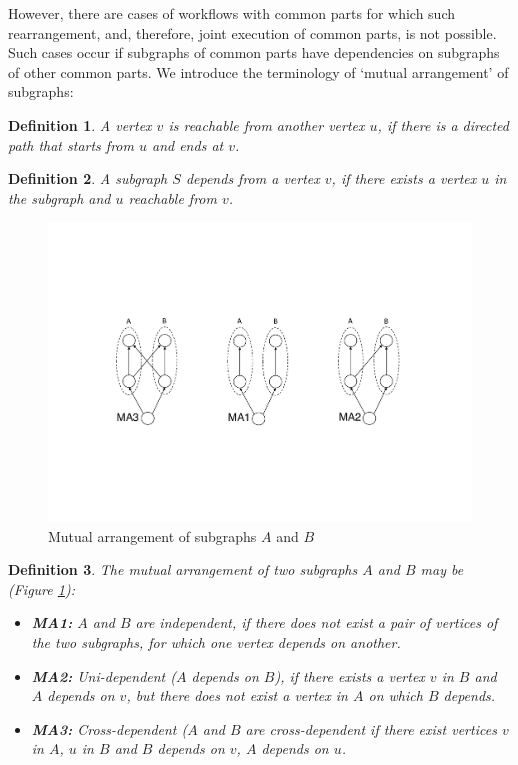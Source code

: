 \documentclass[12pt,openany,onecolumn]{book}
\newtheorem{definition}{Definition}
\begin{document}
However, there are cases of workflows with common parts for which such rearrangement, and, therefore, joint execution of common parts, is not possible. Such cases occur if subgraphs of common parts have dependencies on subgraphs of other common parts. We introduce the terminology of `mutual arrangement' of subgraphs:
\begin{definition}
A vertex $v$ is reachable from another vertex $u$, if there is a directed path that starts from $u$ and ends at $v$.
\end{definition}

\begin{definition}
A subgraph $S$ depends from a vertex $v$, if there exists a vertex $u$ in the subgraph and $u$ reachable from $v$.
\end{definition}

\begin{figure}[h]
\centering
\includegraphics[width=\linewidth]{figs/mutualpositions}
\caption{Mutual arrangement of subgraphs $A$ and $B$}\label{fig:mutpos}
\end{figure}

\begin{definition}
\label{def:mutpos}
The mutual arrangement of two subgraphs $A$ and $B$ may be (Figure \ref{fig:mutpos}):
\begin{itemize}
\item \textbf{MA1:} $A$ and $B$ are independent, if there does not exist a pair of vertices of the two subgraphs, for which one vertex depends on another.
\item \textbf{MA2:} Uni-dependent ($A$ depends on $B$), if there exists a vertex $v$ in $B$ and $A$ depends on $v$, but there does not exist a vertex in $A$ on which $B$ depends.
\item \textbf{MA3:} Cross-dependent ($A$ and $B$ are cross-dependent if there exist vertices $v$ in $A$, $u$ in $B$ and $B$ depends on $v$, $A$ depends on $u$.
\end{itemize}
\end{definition}
\end{document}
